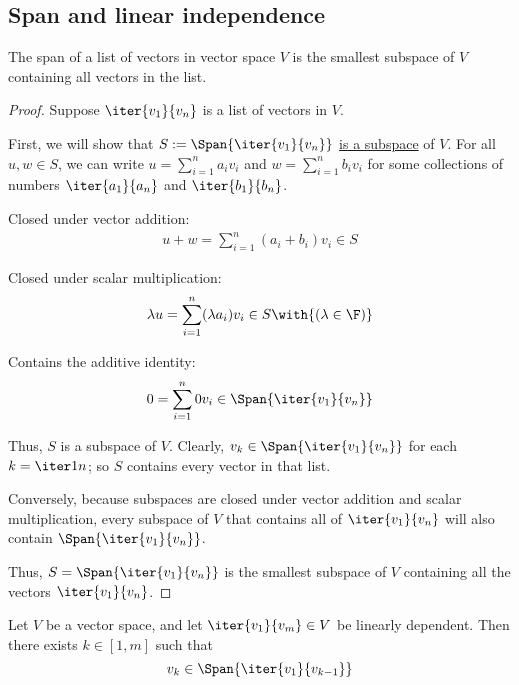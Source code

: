 \subsection{Span and linear independence}\label{aa87399}

\label{fc857d6}

The span of a list of vectors in vector space $V$ is the smallest subspace of
$V$ containing all vectors in the list.

\begin{proof}
  Suppose $\iter{v_1}{v_n}$ is a list of vectors in $V$.

  First, we will show that $S:=\Span\{\iter{v_1}{v_n}\}$ \href{dea139b}{is a
  subspace} of $V$. For all $u,w\in S$, we can write $u=\sum_{i=1}^na_iv_i$ and
  $w=\sum_{i=1}^nb_iv_i$ for some collections of numbers $\iter{a_1}{a_n}$ and
  $\iter{b_1}{b_n}$.
  \begin{enumerati}
    \item Closed under vector addition:
    \begin{align*}
      u+w=\sum_{i=1}^n(a_i+b_i)v_i\in S
    \end{align*}
    \item Closed under scalar multiplication:
    \begin{align*}
      \lambda u=\sum_{i=1}^n(\lambda a_i)v_i\in S\with{(\lambda\in\F)}
    \end{align*}
    \item Contains the additive identity:
    $$
      0=\sum_{i=1}^n0v_i\in\Span\{\iter{v_1}{v_n}\}
    $$
  \end{enumerati}

  Thus, $S$ is a subspace of $V$. Clearly, $v_k\in\Span\{\iter{v_1}{v_n}\}$ for
  each $k=\iter1n$; so $S$ contains every vector in that list.

  Conversely, because subspaces are closed under vector addition and scalar
  multiplication, every subspace of $V$ that contains all of $\iter{v_1}{v_n}$
  will also contain $\Span\{\iter{v_1}{v_n}\}$.

  Thus, $S=\Span\{\iter{v_1}{v_n}\}$ is the smallest subspace of $V$ containing
  all the vectors $\iter{v_1}{v_n}$.
\end{proof}

\label{ba96a6f}

Let $V$ be a vector space, and let $\iter{v_1}{v_m}\in V$ be linearly
dependent. Then there exists $k\in[1,m]$ such that
$$
  v_k\in\Span\{\iter{v_1}{v_{k-1}}\}
$$

